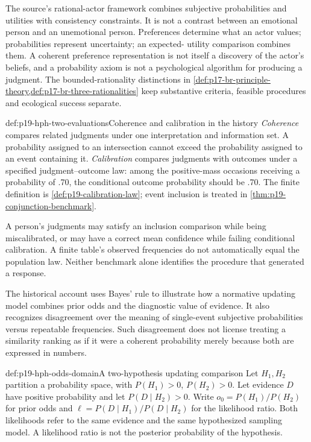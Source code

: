 The source's rational-actor framework combines subjective probabilities
and utilities with consistency constraints. It is not a contrast between
an emotional person and an unemotional person. Preferences determine
what an actor values; probabilities represent uncertainty; an expected-
utility comparison combines them. A coherent preference representation
is not itself a discovery of the actor's beliefs, and a probability
axiom is not a psychological algorithm for producing a judgment.
The bounded-rationality distinctions in
\cref{def:p17-br-principle-theory,def:p17-br-three-rationalities}
keep substantive criteria, feasible procedures and ecological success
separate.

\begin{hbdefinition}{def:p19-hph-two-evaluations}{Coherence and calibration in the history}
\emph{Coherence} compares related judgments under one interpretation and
information set. A probability assigned to an intersection cannot exceed
the probability assigned to an event containing it. \emph{Calibration}
compares judgments with outcomes under a specified judgment--outcome law:
among the positive-mass occasions receiving a probability of .70, the
conditional outcome probability should be .70. The finite definition is
\cref{def:p19-calibration-law}; event inclusion is treated in
\cref{thm:p19-conjunction-benchmark}.

A person's judgments may satisfy an inclusion comparison while being
miscalibrated, or may have a correct mean confidence while failing
conditional calibration. A finite table's observed frequencies do not
automatically equal the population law. Neither benchmark alone identifies
the procedure that generated a response.
\end{hbdefinition}

The historical account uses Bayes' rule to illustrate how a normative
updating model combines prior odds and the diagnostic value of evidence.
It also recognizes disagreement over the meaning of single-event
subjective probabilities versus repeatable frequencies. Such disagreement
does not license treating a similarity ranking as if it were a coherent
probability merely because both are expressed in numbers.

\begin{hbdefinition}{def:p19-hph-odds-domain}{A two-hypothesis updating comparison}
Let \(H_1,H_2\) partition a probability space, with
\(P(H_1)>0\), \(P(H_2)>0\). Let evidence \(D\) have positive
probability and let \(P(D\mid H_2)>0\). Write
\(o_0=P(H_1)/P(H_2)\) for prior odds and
\(\ell=P(D\mid H_1)/P(D\mid H_2)\) for the likelihood ratio.
Both likelihoods refer to the same evidence and the same hypothesized
sampling model. A likelihood ratio is not the posterior probability of
the hypothesis.
\end{hbdefinition}

